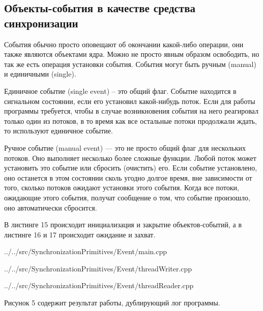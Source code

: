\documentclass[a4paper, 12pt]{article}		%
\begin{document}
\newpage
\subsection{Объекты-события в качестве средства синхронизации}

События обычно просто оповещают об окончании какой-либо операции, они также являются объектами ядра. Можно не просто явным образом освободить, но так же есть операция установки события. События могут быть ручным (manual) и единичными (single).

Единичное событие (single event) – это общий флаг. Событие находится в сигнальном состоянии, если его установил какой-нибудь поток. Если для работы программы требуется, чтобы в случае возникновения события на него реагировал только один из потоков, в то время как все остальные потоки продолжали ждать, то используют единичное событие\cite{Ogins}.

Ручное событие (manual event) — это не просто общий флаг для нескольких потоков. Оно выполняет несколько более сложные функции. Любой поток может установить это событие или сбросить (очистить) его. Если событие установлено, оно останется в этом состоянии сколь угодно долгое время, вне зависимости от того, сколько потоков ожидают установки этого события. Когда все потоки, ожидающие этого события, получат сообщение о том, что событие произошло, оно автоматически сбросится.

В листинге 15 происходит инициализация и закрытие объектов-событий, а в листинге 16 и 17 происходит ожидание и захват.


{../../src/SynchronizationPrimitives/Event/main.cpp}


{../../src/SynchronizationPrimitives/Event/threadWriter.cpp}


{../../src/SynchronizationPrimitives/Event/threadReader.cpp}

Рисунок 5 содержит результат работы, дублирующий лог программы.
\end{document}
